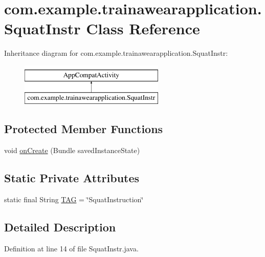 \hypertarget{classcom_1_1example_1_1trainawearapplication_1_1_squat_instr}{}\section{com.\+example.\+trainawearapplication.\+Squat\+Instr Class Reference}
\label{classcom_1_1example_1_1trainawearapplication_1_1_squat_instr}
Inheritance diagram for com.\+example.\+trainawearapplication.\+Squat\+Instr\+:\begin{figure}[H]
\begin{center}
\leavevmode
\includegraphics[height=2.000000cm]{classcom_1_1example_1_1trainawearapplication_1_1_squat_instr}
\end{center}
\end{figure}
\subsection*{Protected Member Functions}
\begin{DoxyCompactItemize}
\item 
void \mbox{\hyperlink{classcom_1_1example_1_1trainawearapplication_1_1_squat_instr_a7e7f753fc9bfbdc0dc8b8db20a59713e}{on\+Create}} (Bundle saved\+Instance\+State)
\end{DoxyCompactItemize}
\subsection*{Static Private Attributes}
\begin{DoxyCompactItemize}
\item 
static final String \mbox{\hyperlink{classcom_1_1example_1_1trainawearapplication_1_1_squat_instr_ad7fe74204afe9fb8319e762c400a9d9d}{T\+AG}} = \char`\"{}Squat\+Instruction\char`\"{}
\end{DoxyCompactItemize}


\subsection{Detailed Description}


Definition at line 14 of file Squat\+Instr.\+java.



